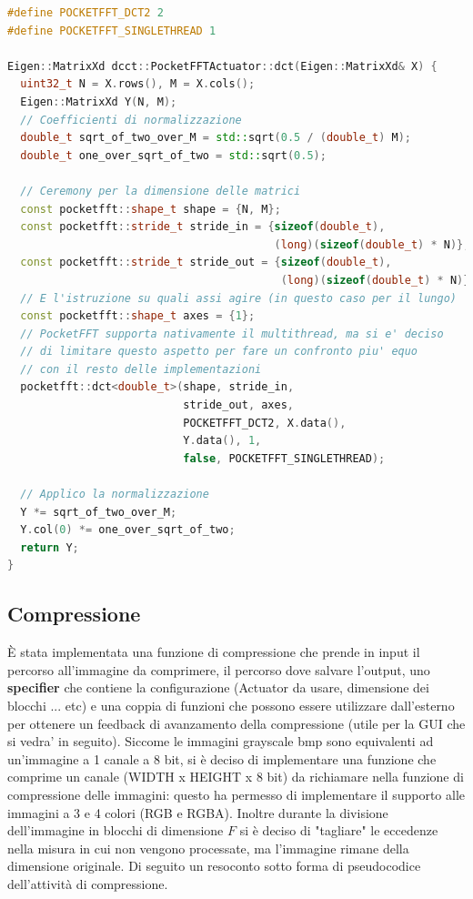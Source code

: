 \documentclass[a4paper,11pt,oneside, table]{article}
\begin{document}
\begin{lstlisting}[language=C++]
#define POCKETFFT_DCT2 2
#define POCKETFFT_SINGLETHREAD 1

Eigen::MatrixXd dcct::PocketFFTActuator::dct(Eigen::MatrixXd& X) {
  uint32_t N = X.rows(), M = X.cols();
  Eigen::MatrixXd Y(N, M);
  // Coefficienti di normalizzazione
  double_t sqrt_of_two_over_M = std::sqrt(0.5 / (double_t) M);
  double_t one_over_sqrt_of_two = std::sqrt(0.5);

  // Ceremony per la dimensione delle matrici
  const pocketfft::shape_t shape = {N, M};
  const pocketfft::stride_t stride_in = {sizeof(double_t),
                                         (long)(sizeof(double_t) * N)};
  const pocketfft::stride_t stride_out = {sizeof(double_t),
                                          (long)(sizeof(double_t) * N)};
  // E l'istruzione su quali assi agire (in questo caso per il lungo)
  const pocketfft::shape_t axes = {1};
  // PocketFFT supporta nativamente il multithread, ma si e' deciso
  // di limitare questo aspetto per fare un confronto piu' equo
  // con il resto delle implementazioni
  pocketfft::dct<double_t>(shape, stride_in,
                           stride_out, axes,
                           POCKETFFT_DCT2, X.data(),
                           Y.data(), 1,
                           false, POCKETFFT_SINGLETHREAD);

  // Applico la normalizzazione
  Y *= sqrt_of_two_over_M;
  Y.col(0) *= one_over_sqrt_of_two;
  return Y;
}
\end{lstlisting}

\subsection{Compressione}

\`E stata implementata una funzione di compressione che prende in input il percorso all'immagine da comprimere, il percorso dove salvare l'output, uno \textbf{specifier} che contiene la configurazione (Actuator da usare, dimensione dei blocchi ... etc) e una coppia di funzioni che possono essere utilizzare dall'esterno per ottenere un feedback di avanzamento della compressione (utile per la GUI che si vedra' in seguito).
Siccome le immagini grayscale bmp sono equivalenti ad un'immagine a 1 canale a 8 bit, si \`e deciso di implementare una funzione che comprime un canale (WIDTH x HEIGHT x 8 bit) da richiamare nella funzione di compressione delle immagini: questo ha permesso di implementare il supporto alle immagini a 3 e 4 colori (RGB e RGBA).
Inoltre durante la divisione dell'immagine in blocchi di dimensione $F$ si \`e deciso di "tagliare" le eccedenze nella misura in cui non vengono processate, ma l'immagine rimane della dimensione originale.
Di seguito un resoconto sotto forma di pseudocodice dell'attivit\`a di compressione.
\end{document}
